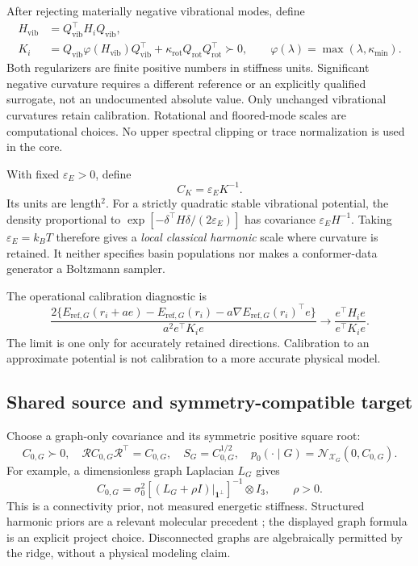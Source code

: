\documentclass[11pt,letterpaper]{article}
\newcommand{\X}{\mathcal X_G}
\newcommand{\cN}{\mathcal N}
\newcommand{\epsE}{\varepsilon_E}
\begin{document}
After rejecting materially negative vibrational modes, define
\begin{equation}
\begin{split}
H_{\mathrm{vib}}&=Q_{\mathrm{vib}}^\top H_iQ_{\mathrm{vib}},\\
K_i&=Q_{\mathrm{vib}}\varphi(H_{\mathrm{vib}})Q_{\mathrm{vib}}^\top
+\kappa_{\mathrm{rot}}Q_{\mathrm{rot}}Q_{\mathrm{rot}}^\top\succ0,
\qquad \varphi(\lambda)=\max(\lambda,\kappa_{\min}).
\end{split}
\label{eq:regularize}
\end{equation}
Both regularizers are finite positive numbers in stiffness units. Significant negative curvature requires a different reference or an explicitly qualified surrogate, not an undocumented absolute value. Only unchanged vibrational curvatures retain calibration. Rotational and floored-mode scales are computational choices. No upper spectral clipping or trace normalization is used in the core.

With fixed $\epsE>0$, define
\begin{equation}
\boxed{C_K=\epsE K^{-1}.}
\label{eq:calibrated}
\end{equation}
Its units are length$^2$. For a strictly quadratic stable vibrational potential, the density proportional to $\exp[-\delta^\top H\delta/(2\epsE)]$ has covariance $\epsE H^{-1}$. Taking $\epsE=k_BT$ therefore gives a \emph{local classical harmonic} scale where curvature is retained. It neither specifies basin populations nor makes a conformer-data generator a Boltzmann sampler.

The operational calibration diagnostic is
\begin{equation}
\frac{2\{E_{\mathrm{ref},G}(r_i+ae)-E_{\mathrm{ref},G}(r_i)
-a\nabla E_{\mathrm{ref},G}(r_i)^\top e\}}
{a^2 e^\top K_i e}
\longrightarrow\frac{e^\top H_i e}{e^\top K_i e}.
\label{eq:energy-ratio}
\end{equation}
The limit is one only for accurately retained directions. Calibration to an approximate potential is not calibration to a more accurate physical model.

\subsection{Shared source and symmetry-compatible target}
Choose a graph-only covariance and its symmetric positive square root:
\begin{equation}
C_{0,G}\succ0,\quad \mathcal RC_{0,G}\mathcal R^\top=C_{0,G},\quad
S_G=C_{0,G}^{1/2},\quad p_0(\cdot\mid G)=\cN_{\X}(0,C_{0,G}).
\label{eq:source}
\end{equation}
For example, a dimensionless graph Laplacian $L_G$ gives
\begin{equation}
C_{0,G}=\sigma_0^2[(L_G+\rho I)|_{\mathbf1^\perp}]^{-1}\otimes I_3,\qquad\rho>0.
\end{equation}
This is a connectivity prior, not measured energetic stiffness. Structured harmonic priors are a relevant molecular precedent \cite{hassan}; the displayed graph formula is an explicit project choice. Disconnected graphs are algebraically permitted by the ridge, without a physical modeling claim.
\end{document}

